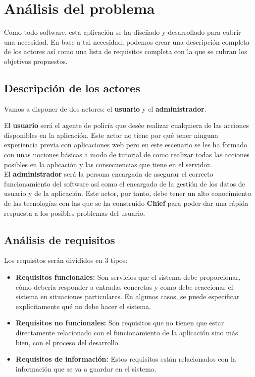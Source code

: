 \chapter{Análisis del problema}
 
 Como todo software, esta aplicación se ha diseñado y desarrollado para cubrir una
 necesidad. En base a tal necesidad, podemos crear una descripción completa de los 
 actores así como una lista de requisitos completa con la que se cubran los objetivos 
 propuestos.

\section{Descripción de los actores}
Vamos a disponer de dos actores: el \textbf{usuario} y el \textbf{administrador}. 

El \textbf{usuario} será el agente de policía que desée realizar cualquiera de las acciones
disponibles en la aplicación. Este actor no tiene por qué tener ninguna experiencia previa
con aplicaciones web pero en este escenario se les ha formado con unas nociones básicas 
a modo de tutorial de como realizar todas las acciones posibles en la aplicación y las consecuencias
que tiene en el servidor.\\

El \textbf{administrador} será la persona encargada de asegurar el correcto funcionamiento 
del software así como el encargado de la gestión de los datos de usuario y de la aplicación. Este
actor, por tanto, debe tener un alto conocimiento de las tecnologías con las que se ha construido
\textbf{Chief} para poder dar una rápida respuesta a los posibles problemas del usuario.

\section{Análisis de requisitos}

Los requisitos serán divididos en 3 tipos:

\begin{itemize}
   \item \textbf{Requisitos funcionales:} Son servicios que el sistema debe proporcionar, cómo
   debería responder a entradas concretas y como debe reaccionar el sistema en situaciones 
   particulares. En algunos casos, se puede especificar explícitamente qué no debe hacer el sistema.

   \item \textbf{Requisitos no funcionales:} Son requisitos que no tienen que estar directamente relacionado
   con el funcionamiento de la aplicación sino más bien, con el proceso del desarrollo.
   
   \item \textbf{Requisitos de información:} Estos requisitos están relacionados con la información 
   que se va a guardar en el sistema.

\end{itemize}

